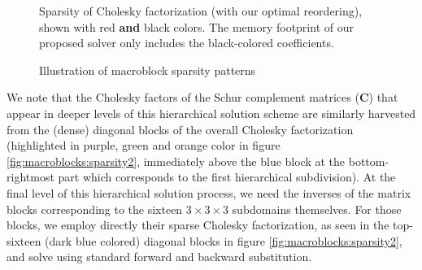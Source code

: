 \begin{figure}[h]
\vspace*{-.35in}
\vspace*{-.1in}
\caption{Illustration of macroblock sparsity patterns}{Sparsity of
  Cholesky factorization (with our optimal reordering), shown with red
  \textbf{and} black colors. The memory footprint of our proposed
  solver only includes the black-colored coefficients.}
\label{fig:macroblocks:sparsity}
\end{figure}

We note that the Cholesky factors of the Schur complement matrices
($\mathbf{C}$) that appear in deeper levels of this hierarchical
solution scheme are similarly harvested from the (dense) diagonal
blocks of the overall Cholesky factorization (highlighted in purple,
green and orange color in figure \ref{fig:macroblocks:sparsity2}, immediately
above the blue block at the bottom-rightmost part which corresponds to
the first hierarchical subdivision). At the final level of this
hierarchical solution process, we need the inverses of the matrix
blocks corresponding to the sixteen $3\times 3\times 3$ subdomains
themselves. For those blocks, we employ directly their sparse Cholesky
factorization, as seen in the top-sixteen (dark blue colored) diagonal
blocks in figure \ref{fig:macroblocks:sparsity2}, and solve using standard forward
and backward substitution.

